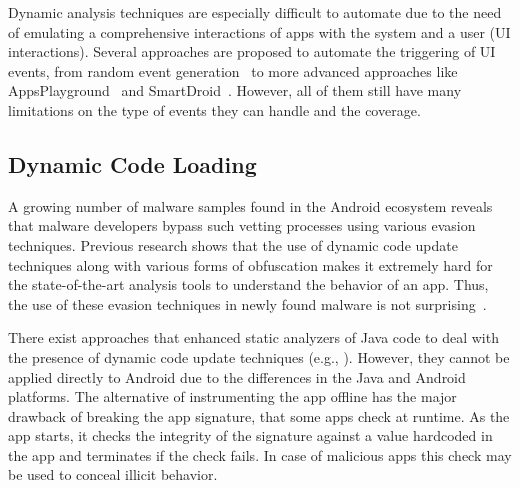 Dynamic analysis techniques are especially difficult to automate due to the need of emulating a comprehensive interactions of apps with the system and a user (UI interactions). Several approaches are proposed to automate the triggering of UI events, from random event generation~\cite{Hu-AST-2011} to more advanced approaches like AppsPlayground~\cite{AppsPlayground_Rastogi2013} and SmartDroid~\cite{SmartDroid_Zheng2012}. However, all of them still have many limitations on the type of events they can handle and the coverage.



\subsection{Dynamic Code Loading}

A growing number of malware samples found in the Android ecosystem reveals that malware developers bypass such vetting processes using various evasion techniques. Previous research shows that the use of dynamic code update techniques along with various forms of obfuscation makes it extremely hard for the state-of-the-art analysis tools to understand the behavior of an app\cite{ExecuteThis_Poeplau2014, ahmad2016empirical}. Thus, the use of these evasion techniques in newly found malware is not surprising~\cite{brain-test}.

There exist approaches that enhanced static analyzers of Java code to deal with the presence of dynamic code update techniques (e.g., \cite{TamingReflection_Bodden2011}). However, they cannot be  applied directly to Android due to the differences in the Java and Android platforms. The alternative of instrumenting the app offline has the  major drawback of breaking the app signature, that some apps check  at runtime. As the app starts, it checks the integrity of the signature against  a  value hardcoded in the app and terminates if the check fails. In case of malicious apps this check may be used to conceal illicit behavior. 

